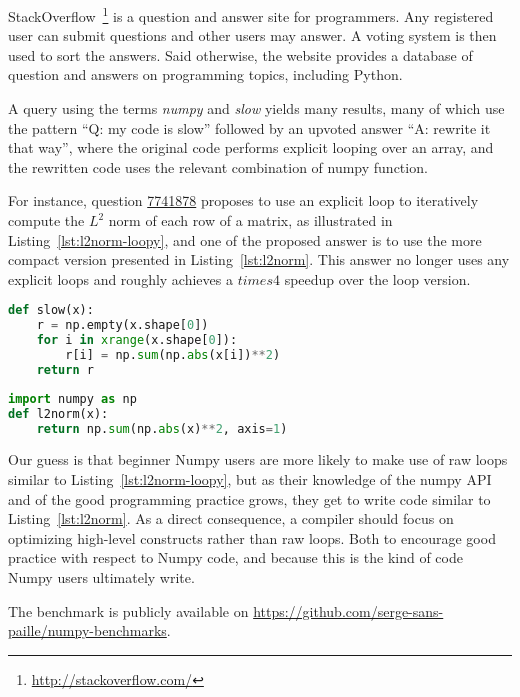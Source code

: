 \documentclass[10pt, preprint]{sigplanconf}
\begin{document}
StackOverflow~\footnote{\url{http://stackoverflow.com/}} is a question and
answer site for programmers. Any registered user can submit questions and other
users may answer. A voting system is then used to sort the answers. Said
otherwise, the website provides a database of question and answers on
programming topics, including Python.

A query using the terms \emph{numpy} and \emph{slow} yields many results, many
of which use the pattern ``Q: my code is slow'' followed by an upvoted answer
``A: rewrite it that way'', where the original code performs explicit looping
over an array, and the rewritten code uses the relevant combination of numpy
function.

For instance, question \href{http://stackoverflow.com/questions/7741878}{7741878}
proposes to use an explicit loop to iteratively compute the $L^2$ norm of each
row of a matrix, as illustrated in Listing~\ref{lst:l2norm-loopy}, and one of
the proposed answer is to use the more compact version presented in
Listing~\ref{lst:l2norm}. This answer no longer uses any explicit loops and
roughly achieves a $times 4$ speedup over the loop version.

\begin{lstlisting}[language=python,caption={Per row version of $L^2$ norm with loop in numpy.}, float, label={lst:l2norm-loopy}]
def slow(x):
    r = np.empty(x.shape[0])
    for i in xrange(x.shape[0]):
        r[i] = np.sum(np.abs(x[i])**2)
    return r
\end{lstlisting}

\begin{lstlisting}[language=python,caption={Per row version of $L^2$ norm without loop in numpy.}, float, label={lst:l2norm}]
import numpy as np
def l2norm(x):
    return np.sum(np.abs(x)**2, axis=1)
\end{lstlisting}

Our guess is that beginner Numpy users are more likely to make use of raw loops
similar to Listing~\ref{lst:l2norm-loopy}, but as their knowledge of the numpy
API and of the good programming practice grows, they get to write code similar
to Listing~\ref{lst:l2norm}. As a direct consequence, a compiler should
focus on optimizing high-level constructs rather than raw loops. Both to encourage good
practice with respect to Numpy code, and because this is the kind of code Numpy
users ultimately write.

The benchmark is publicly available on
\url{https://github.com/serge-sans-paille/numpy-benchmarks}.
\end{document}
